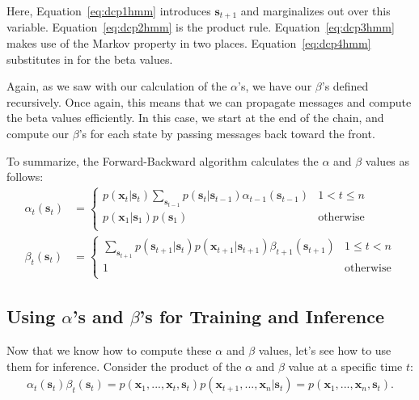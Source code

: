 Here, Equation~\eqref{eq:dcp1hmm} introduces $\textbf{s}_{t+1}$ and marginalizes out over this variable.
Equation~\eqref{eq:dcp2hmm} is the product rule. Equation~\eqref{eq:dcp3hmm} makes use of the Markov property in two places. Equation~\eqref{eq:dcp4hmm} substitutes in for the beta values.

Again, as we saw with our calculation of the $\alpha$'s, we have our $\beta$'s defined recursively. Once again, this means that we can propagate messages and compute the beta values
efficiently. In this case, we start at the end of the chain, and compute our $\beta$'s for each state by passing messages back toward the front.

To summarize, the Forward-Backward algorithm calculates the $\alpha$ and $\beta$ values as follows:\
%
\begin{align*}
	\alpha_t(\textbf{s}_t) &=
	\begin{cases} 
      p(\textbf{x}_t | \textbf{s}_t) \sum_{\textbf{s}_{t-1}} p(\textbf{s}_t | \textbf{s}_{t-1}) \alpha_{t-1}(\textbf{s}_{t-1}) & 1 < t \leq n \\
      p(\textbf{x}_1 | \textbf{s}_{1}) p(\textbf{s}_1) & \text{otherwise} \\
   \end{cases} \\
   \beta_t(\textbf{s}_t) &=
   \begin{cases} 
      \sum_{\textbf{s}_{t+1}} p(\textbf{s}_{t+1} | \textbf{s}_t) p(\textbf{x}_{t+1} | \textbf{s}_{t+1}) \beta_{t+1}(\textbf{s}_{t+1}) & 1 \leq t < n \\
      1 & \text{otherwise} \\
   \end{cases}
\end{align*}


\subsection{Using $\alpha$'s and $\beta$'s for Training and Inference}

Now that we know how to compute these $\alpha$ and $\beta$ values,
let's see how to use them for inference.
%
Consider the product of the $\alpha$ and $\beta$ value at a specific time $t$:
%
\begin{align*}
	\alpha_t(\textbf{s}_t) \beta_t(\textbf{s}_t) = p(\textbf{x}_1, ..., \textbf{x}_t, \textbf{s}_t) p(\textbf{x}_{t+1}, ..., \textbf{x}_n | \textbf{s}_t) = p(\textbf{x}_1, ..., \textbf{x}_n, \textbf{s}_t).
\end{align*}

